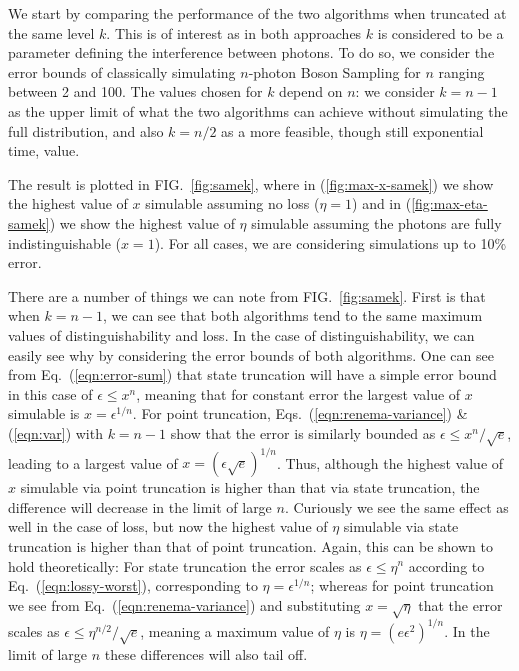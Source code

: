 We start by comparing the performance of the two algorithms when truncated at the same level $k$. 
This is of interest as in both approaches $k$ is considered to be a parameter defining the interference between photons. 
To do so, we consider the error bounds of classically simulating $n$-photon Boson Sampling for $n$ ranging between 2 and 100. 
The values chosen for $k$ depend on $n$: we consider $k=n-1$ as the upper limit of what the two algorithms can achieve without simulating the full distribution, and also $k=n/2$ as a more feasible, though still exponential time, value.

The result is plotted in FIG.\ \ref{fig:samek}, where in (\ref{fig:max-x-samek}) we show the highest value of $x$ simulable assuming no loss ($\eta=1$) and in (\ref{fig:max-eta-samek}) we show the highest value of $\eta$ simulable assuming the photons are fully indistinguishable ($x=1$). 
For all cases, we are considering simulations up to 10\% error.

There are a number of things we can note from FIG.\ \ref{fig:samek}. 
First is that when $k=n-1$, we can see that both algorithms tend to the same maximum values of distinguishability and loss. 
In the case of distinguishability, we can easily see why by considering the error bounds of both algorithms. 
One can see from Eq.\ (\ref{eqn:error-sum}) that state truncation will have a simple error bound in this case of $\epsilon \leq x^n$, meaning that for constant error the largest value of $x$ simulable is $x = \epsilon^{1/n}$. 
For point truncation, Eqs.\ (\ref{eqn:renema-variance}) \& (\ref{eqn:var}) with $k=n-1$ show that the error is similarly bounded as $\epsilon \leq x^n/\sqrt{e}$, leading to a largest value of $x=(\epsilon\sqrt{e})^{1/n}$. 
Thus, although the highest value of $x$ simulable via point truncation is higher than that via state truncation, the difference will decrease in the limit of large $n$. 
Curiously we see the same effect as well in the case of loss, but now the highest value of $\eta$ simulable via state truncation is higher than that of point truncation. 
Again, this can be shown to hold theoretically: For state truncation the error scales as $\epsilon \leq \eta^n$ according to Eq.\ (\ref{eqn:lossy-worst}), corresponding to $\eta=\epsilon^{1/n}$; whereas for point truncation we see from Eq.\ (\ref{eqn:renema-variance}) and substituting $x=\sqrt{\eta}$ that the error scales as $\epsilon \leq \eta^{n/2}/\sqrt{e}$, meaning a maximum value of $\eta$ is $\eta=(e\epsilon^2)^{1/n}$. 
In the limit of large $n$ these differences will also tail off.

